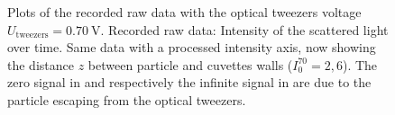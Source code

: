 \documentclass[../bericht.tex]{subfiles}
\begin{document}
      \begin{figure}[tb]
        \centering
        \hfill
        \caption{Plots of the recorded raw data with the optical tweezers voltage $U_\mathrm{tweezers}=\SI{0,70}{\volt}$. \protect{} Recorded raw data: Intensity of the scattered light over time. \protect{} Same data with a processed intensity axis, now showing the distance $z$ between particle and cuvettes walls ($I_0^{70}=2,6$). The zero signal in \protect{} and respectively the infinite signal in \protect{} are due to the particle escaping from the optical tweezers.}
        \label{fig:70-i-t-z-t}
      \end{figure}
\end{document}
